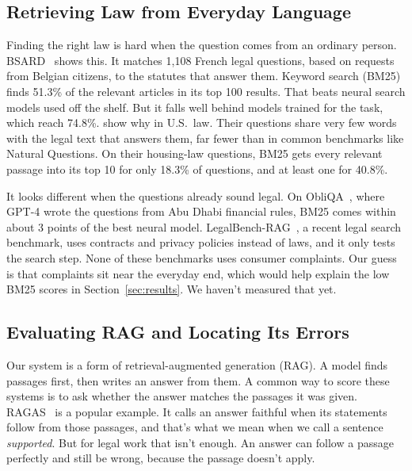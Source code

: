 \documentclass[10pt]{article}
\begin{document}
\subsection{Retrieving Law from Everyday Language}
Finding the right law is hard when the question comes from an ordinary person.
BSARD~\cite{louis2022bsard} shows this. It matches 1,108 French legal questions,
based on requests from Belgian citizens, to the statutes that answer them.
Keyword search (BM25) finds 51.3\% of the relevant articles in its top 100
results. That beats neural search models used off the shelf. But it falls well
behind models trained for the task, which reach 74.8\%.
\citet{zheng2025reasoning} show why in U.S.\ law. Their questions
share very few words with the legal text that answers them, far fewer than in
common benchmarks like Natural Questions. On their housing-law questions, BM25
gets every relevant passage into its top 10 for only 18.3\% of questions, and at
least one for 40.8\%.

It looks different when the questions already sound legal. On
ObliQA~\cite{gokhan2024rirag}, where GPT-4 wrote the questions from Abu Dhabi
financial rules, BM25 comes within about 3 points of the best neural model.
LegalBench-RAG~\cite{pipitone2024legalbench}, a recent legal search benchmark,
uses contracts and privacy policies instead of laws, and it only tests the
search step. None of these benchmarks uses consumer complaints. Our guess is that
complaints sit near the everyday end, which would help explain the low BM25
scores in Section~\ref{sec:results}. We haven't measured that yet.

\subsection{Evaluating RAG and Locating Its Errors}
Our system is a form of retrieval-augmented generation (RAG). A model finds
passages first, then writes an answer from them. A common way to score these
systems is to ask whether the answer matches the passages it was given.
RAGAS~\cite{es2024ragas} is a popular example. It calls an answer faithful when
its statements follow from those passages, and that's what we mean when we call
a sentence \emph{supported}. But for legal work that isn't enough. An answer can
follow a passage perfectly and still be wrong, because the passage doesn't
apply.
\end{document}
